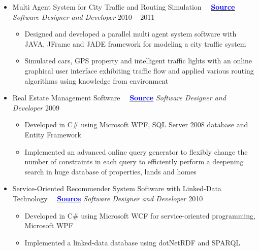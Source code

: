 \documentclass[letter]{res}
\begin{document}
\begin{resume}
\begin{itemize}[leftmargin=-.1in]
			\item Multi Agent System for City Traffic and Routing Simulation ~~{\href{https://github.com/omid55/city_routing_model_jade_mutli_agent_system}{\textbf{\textcolor{blue}{Source}}}} \newline
			{\sl Software Designer and Developer} \hfill 2010 – 2011\\
			\vspace{-4mm}
			\iflong
			\begin{itemize}
				\item Designed and developed a parallel multi agent system software with JAVA, JFrame and JADE framework for modeling a city traffic system
				\item Simulated cars, GPS property and intelligent traffic lights with an online graphical user interface exhibiting traffic flow and applied various routing algorithms using knowledge from environment
			\end{itemize}
			\fi
			
			\item Real Estate Management Software ~~{\href{https://github.com/omid55/real_state_manager}{\textbf{\textcolor{blue}{Source}}}}
			\newline
			{\sl Software Designer and Developer} \hfill 2009\\
			\vspace{-4mm}
			\iflong
			\begin{itemize}
				\item Developed in C\# using Microsoft WPF, SQL Server 2008 database and Entity Framework
				\item Implemented an advanced online query generator to flexibly change the number of constraints in each query to efficiently perform a deepening search in huge database of properties, lands and homes
			\end{itemize}
			\fi
			
			\item Service-Oriented Recommender System Software with Linked-Data Technology ~~{\href{https://github.com/omid55/service_oriented_linked_data_based_recommender_system}{\textbf{\textcolor{blue}{Source}}}}
			\newline
			{\sl Software Designer and Developer} \hfill 2010\\
			\vspace{-4mm}
			\iflong
			\begin{itemize}
				\item Developed in C\# using Microsoft WCF for service-oriented programming, Microsoft WPF
				\item Implemented a linked-data database using dotNetRDF and SPARQL
			\end{itemize}
			\fi
			

\end{itemize}
\end{resume}
\end{document}
